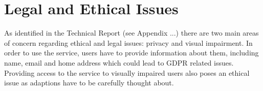 \section{Legal and Ethical Issues}
As identified in the Technical Report (see Appendix ...) there are two main areas of concern regarding ethical and legal issues: privacy and visual impairment. In order to use the service, users have to provide information about them, including name, email and home address which could lead to GDPR related issues. Providing access to the service to visually impaired users also poses an ethical issue as adaptions have to be carefully thought about.